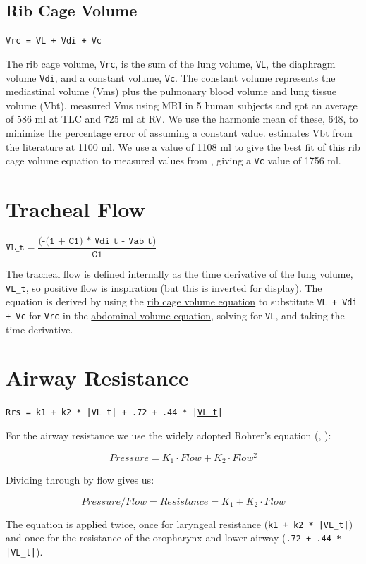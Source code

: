 \documentclass[12pt,openany,oneside]{book}
\newcommand{\ticode}[1]{\texttt{#1}}
\begin{document}
\subsection{Rib Cage Volume}
\ticode{Vrc = VL + Vdi + Vc}

The rib cage volume, \ticode{Vrc}, is the sum of the lung volume,
\ticode{VL}, the diaphragm volume \ticode{Vdi}, and a constant volume,
\ticode{Vc}. The constant volume represents the mediastinal volume
(Vms) plus the pulmonary blood volume and lung tissue volume (Vbt).
\citet{Cluzel01052000} measured Vms using MRI in 5 human subjects and
got an average of 586 ml at TLC and 725 ml at RV. We use the harmonic
mean of these, 648, to minimize the percentage error of assuming a
constant value. \citet{Cluzel01052000} estimates Vbt from the
literature at 1100 ml. We use a value of 1108 ml to give the best fit
of this rib cage volume equation to measured values from
\citet{Cluzel01052000}, giving a \ticode{Vc} value of 1756 ml.

\section{Tracheal Flow}

$\ticode{VL\_t} =\dfrac{\ticode{(-(1 + C1) * Vdi\_t -
Vab\_t)}}{\ticode{C1}}$

The tracheal flow is defined internally as the time derivative of the
lung volume, \ticode{VL\_t}, so positive flow is inspiration (but this
is inverted for display). The equation is derived by using the \hyperref[rib
cage volume]{rib cage volume equation} to substitute \ticode{VL + Vdi + Vc} for
\ticode{Vrc} in the \hyperref[abdominal volume]{abdominal volume equation}, solving for
\ticode{VL}, and taking the time derivative.

\section{Airway Resistance}

\ticode{Rrs = k1 + k2 * |VL\_t| + .72 + .44 * |\hyperlink{VL_t}{VL\_t}|}

For the airway resistance we use the widely adopted Rohrer's equation
(\citet{Hey01091982}, \citet{Rohrer1915}):

\[Pressure = K_1\cdot Flow+K_2\cdot Flow^2\]

Dividing through by flow gives us:

\[Pressure/Flow = Resistance = K_1+K_2\cdot Flow\]

The equation is applied twice, once for laryngeal resistance
(\ticode{k1 + k2 * |VL\_t|}) and once for the resistance of the
oropharynx and lower airway (\ticode{.72 + .44 * |VL\_t|}).
\end{document}
